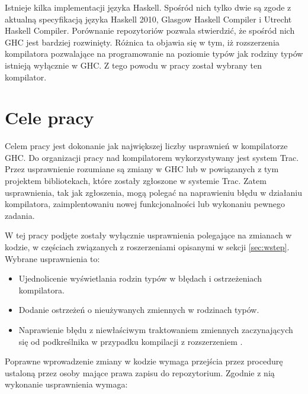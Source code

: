 Istnieje kilka implementacji języka Haskell. Spośród nich tylko dwie są zgode z aktualną specyfikacją języka Haskell 2010, Glasgow Haskell Compiler i Utrecht Haskell Compiler\cite{WikiImplementations}. Porównanie repozytoriów pozwala stwierdzić, że spośród nich GHC jest bardziej rozwinięty. Różnica ta objawia się w tym, iż rozszerzenia kompilatora pozwalające na programowanie na poziomie typów jak rodziny typów istnieją wyłącznie w GHC\cite{UHCUserGuide}. Z tego powodu w pracy został wybrany ten kompilator.


\section{Cele pracy}\label{sec:cele_pracy}

Celem pracy jest dokonanie jak największej liczby usprawnień w kompilatorze GHC. Do organizacji pracy nad kompilatorem wykorzystywany jest system Trac. Przez usprawnienie rozumiane są zmiany w GHC lub w powiązanych z tym projektem bibliotekach, które zostały zgłoszone w systemie Trac. Zatem usprawnienia, tak jak zgłoszenia, mogą polegać na naprawieniu błędu w działaniu kompilatora, zaimplentowaniu nowej funkcjonalności lub wykonaniu pewnego zadania.

W tej pracy podjęte zostały wyłącznie usprawnienia polegające na zmianach w kodzie, w częściach związanych z roszerzeniami opisanymi w sekcji \ref{sec:wstep}. Wybrane usprawnienia to:

\begin{itemize}
 \item Ujednolicenie wyświetlania rodzin typów w błędach i ostrzeżeniach kompilatora.
 \item Dodanie ostrzeżeń o nieużywanych zmiennych w rodzinach typów.
 \item Naprawienie błędu z niewłaściwym traktowaniem zmiennych zaczynających się od podkreślnika w przypadku kompilacji z rozszerzeniem .
\end{itemize}

Poprawne wprowadzenie zmiany w kodzie wymaga przejścia przez procedurę ustaloną przez osoby mające prawa zapisu do repozytorium\cite{WikiFixingBugs}. Zgodnie z nią wykonanie usprawnienia wymaga:

